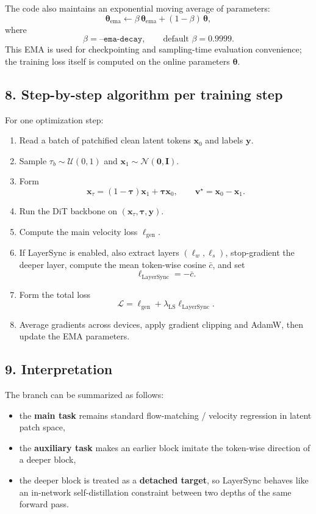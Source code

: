 \documentclass[11pt]{article}
\begin{document}
The code also maintains an exponential moving average of parameters:
\[
  \bm{\theta}_{\mathrm{ema}}
  \leftarrow
  \beta\,\bm{\theta}_{\mathrm{ema}}
  +
  (1-\beta)\,\bm{\theta},
\]
where
\[
  \beta = \texttt{--ema-decay},
  \qquad
  \text{default } \beta=0.9999.
\]
This EMA is used for checkpointing and sampling-time evaluation convenience; the training loss itself is computed on the online parameters $\bm{\theta}$.

\subsection*{8. Step-by-step algorithm per training step}
For one optimization step:
\begin{enumerate}
  \item Read a batch of patchified clean latent tokens $\bm{x}_0$ and labels $\bm{y}$.
  \item Sample $\tau_b\sim\mathcal{U}(0,1)$ and $\bm{x}_1\sim\mathcal{N}(\bm{0},\bm{I})$.
  \item Form
  \[
    \bm{x}_\tau = (1-\bm{\tau})\bm{x}_1 + \bm{\tau}\bm{x}_0,
    \qquad
    \bm{v}^\star = \bm{x}_0 - \bm{x}_1.
  \]
  \item Run the DiT backbone on $(\bm{x}_\tau,\bm{\tau},\bm{y})$.
  \item Compute the main velocity loss $\ell_{\mathrm{gen}}$.
  \item If LayerSync is enabled, also extract layers $(\ell_w,\ell_s)$, stop-gradient the deeper layer, compute the mean token-wise cosine $\bar{c}$, and set
  \[
    \ell_{\mathrm{LayerSync}}=-\bar{c}.
  \]
  \item Form the total loss
  \[
    \mathcal{L}=\ell_{\mathrm{gen}}+\lambda_{\mathrm{LS}}\ell_{\mathrm{LayerSync}}.
  \]
  \item Average gradients across devices, apply gradient clipping and AdamW, then update the EMA parameters.
\end{enumerate}

\subsection*{9. Interpretation}
The branch can be summarized as follows:
\begin{itemize}
  \item the \textbf{main task} remains standard flow-matching / velocity regression in latent patch space,
  \item the \textbf{auxiliary task} makes an earlier block imitate the token-wise direction of a deeper block,
  \item the deeper block is treated as a \textbf{detached target}, so LayerSync behaves like an in-network self-distillation constraint between two depths of the same forward pass.
\end{itemize}
\end{document}
